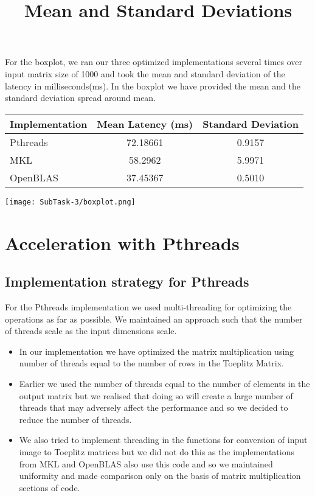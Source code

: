 \documentclass[10pt,a4paper,titlepage]{article}
\begin{document}
For the boxplot, we ran our three optimized implementations several times over input matrix size of 1000 and took the mean and standard deviation of the latency in milliseconds(ms). In the boxplot we have provided the mean and the standard deviation spread around mean.
\newline
\begin{center}

\title{\begin{Large}
Mean and Standard Deviations
\end{Large}}
\newline
\newline

\begin{tabular}{l|c|c}
\textbf{Implementation} & \textbf{Mean Latency (ms)} & \textbf{Standard Deviation}\\
\hline
Pthreads & 72.18661 & 0.9157 \\
MKL & 58.2962 & 5.9971 \\
OpenBLAS & 37.45367 & 0.5010 \\
\end{tabular}

\texttt{[image: SubTask-3/boxplot.png]} 

\end{center}

\section{Acceleration with Pthreads}
\subsection{Implementation strategy for Pthreads}
For the Pthreads implementation we used multi-threading\cite{Tutor} for optimizing the operations as far as possible. We maintained an approach such that the number of threads scale as the input dimensions scale.
\begin{itemize}
\item In our implementation we have optimized the matrix multiplication using number of threads equal to the number of rows in the Toeplitz Matrix.
\item Earlier we used the number of threads equal to the number of elements in the output matrix but we realised that doing so will create a large number of threads that may adversely affect the performance and so we decided to reduce the number of threads.
\item We also tried to implement threading in the functions for conversion of input image to Toeplitz matrices but we did not do this as the implementations from MKL and OpenBLAS also use this code and so we maintained uniformity and made comparison only on the basis of matrix multiplication sections of code.
\end{itemize}
\end{document}
